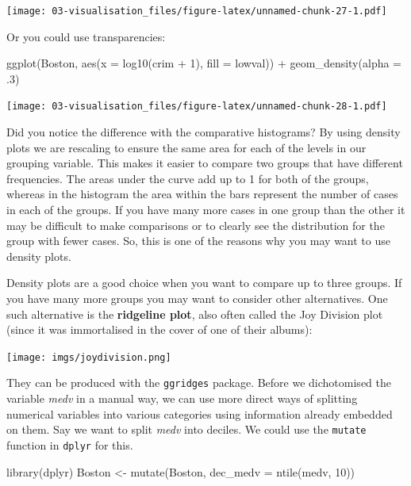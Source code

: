 \documentclass[
]{book}
\newenvironment{Shaded}{\begin{snugshade}}{\end{snugshade}}
\newcommand{\AttributeTok}[1]{\textcolor[rgb]{0.77,0.63,0.00}{#1}}
\newcommand{\DecValTok}[1]{\textcolor[rgb]{0.00,0.00,0.81}{#1}}
\newcommand{\FunctionTok}[1]{\textcolor[rgb]{0.00,0.00,0.00}{#1}}
\newcommand{\NormalTok}[1]{#1}
\newcommand{\OtherTok}[1]{\textcolor[rgb]{0.56,0.35,0.01}{#1}}
\newcommand{\SpecialCharTok}[1]{\textcolor[rgb]{0.00,0.00,0.00}{#1}}
\begin{document}
\texttt{[image: 03-visualisation\_files/figure-latex/unnamed-chunk-27-1.pdf]}

Or you could use transparencies:

\begin{Shaded}
\begin{Highlighting}[]
\FunctionTok{ggplot}\NormalTok{(Boston, }\FunctionTok{aes}\NormalTok{(}\AttributeTok{x =} \FunctionTok{log10}\NormalTok{(crim }\SpecialCharTok{+} \DecValTok{1}\NormalTok{), }\AttributeTok{fill =}\NormalTok{ lowval)) }\SpecialCharTok{+} 
  \FunctionTok{geom\_density}\NormalTok{(}\AttributeTok{alpha =}\NormalTok{ .}\DecValTok{3}\NormalTok{)}
\end{Highlighting}
\end{Shaded}

\texttt{[image: 03-visualisation\_files/figure-latex/unnamed-chunk-28-1.pdf]}

Did you notice the difference with the comparative histograms? By using density plots we are rescaling to ensure the same area for each of the levels in our grouping variable. This makes it easier to compare two groups that have different frequencies. The areas under the curve add up to 1 for both of the groups, whereas in the histogram the area within the bars represent the number of cases in each of the groups. If you have many more cases in one group than the other it may be difficult to make comparisons or to clearly see the distribution for the group with fewer cases. So, this is one of the reasons why you may want to use density plots.

Density plots are a good choice when you want to compare up to three groups. If you have many more groups you may want to consider other alternatives. One such alternative is the \textbf{ridgeline plot}, also often called the Joy Division plot (since it was immortalised in the cover of one of their albums):

\texttt{[image: imgs/joydivision.png]}

They can be produced with the \texttt{ggridges} package. Before we dichotomised the variable \emph{medv} in a manual way, we can use more direct ways of splitting numerical variables into various categories using information already embedded on them. Say we want to split \emph{medv} into deciles. We could use the \texttt{mutate} function in \texttt{dplyr} for this.

\begin{Shaded}
\begin{Highlighting}[]
\FunctionTok{library}\NormalTok{(dplyr)}
\NormalTok{Boston }\OtherTok{\textless{}{-}} \FunctionTok{mutate}\NormalTok{(Boston, }\AttributeTok{dec\_medv =} \FunctionTok{ntile}\NormalTok{(medv, }\DecValTok{10}\NormalTok{))}
\end{Highlighting}
\end{Shaded}
\end{document}
